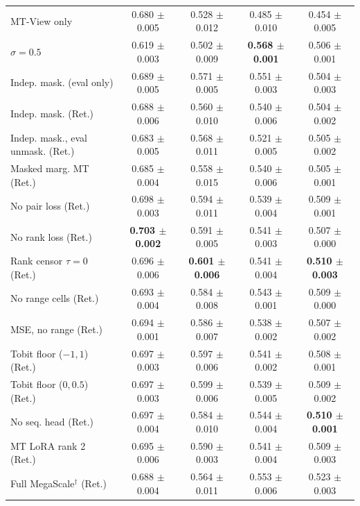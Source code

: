 \begin{table}[H]
{\begin{tabular}{lcccc}
MT-View only & 0.680 $\pm$ 0.005 & 0.528 $\pm$ 0.012 & 0.485 $\pm$ 0.010 & 0.454 $\pm$ 0.005 \\
$\sigma=0.5$ & 0.619 $\pm$ 0.003 & 0.502 $\pm$ 0.009 & \textbf{0.568 $\pm$ 0.001} & 0.506 $\pm$ 0.001 \\
Indep. mask. (eval only) & 0.689 $\pm$ 0.005 & 0.571 $\pm$ 0.005 & 0.551 $\pm$ 0.003 & 0.504 $\pm$ 0.003 \\
Indep. mask. (Ret.) & 0.688 $\pm$ 0.006 & 0.560 $\pm$ 0.010 & 0.540 $\pm$ 0.006 & 0.504 $\pm$ 0.002 \\
Indep. mask., eval unmask. (Ret.) & 0.683 $\pm$ 0.005 & 0.568 $\pm$ 0.011 & 0.521 $\pm$ 0.005 & 0.505 $\pm$ 0.002 \\
Masked marg. MT (Ret.) & 0.685 $\pm$ 0.004 & 0.558 $\pm$ 0.015 & 0.540 $\pm$ 0.006 & 0.505 $\pm$ 0.001 \\
No pair loss (Ret.) & 0.698 $\pm$ 0.003 & 0.594 $\pm$ 0.011 & 0.539 $\pm$ 0.004 & 0.509 $\pm$ 0.001 \\
No rank loss (Ret.) & \textbf{0.703 $\pm$ 0.002} & 0.591 $\pm$ 0.005 & 0.541 $\pm$ 0.003 & 0.507 $\pm$ 0.000 \\
Rank censor $\tau=0$ (Ret.) & 0.696 $\pm$ 0.006 & \textbf{0.601 $\pm$ 0.006} & 0.541 $\pm$ 0.004 & \textbf{0.510 $\pm$ 0.003} \\
No range cells (Ret.) & 0.693 $\pm$ 0.004 & 0.584 $\pm$ 0.008 & 0.543 $\pm$ 0.001 & 0.509 $\pm$ 0.000 \\
MSE, no range (Ret.) & 0.694 $\pm$ 0.001 & 0.586 $\pm$ 0.007 & 0.538 $\pm$ 0.002 & 0.507 $\pm$ 0.002 \\
Tobit floor ($-1, 1$) (Ret.) & 0.697 $\pm$ 0.003 & 0.597 $\pm$ 0.006 & 0.541 $\pm$ 0.002 & 0.508 $\pm$ 0.001 \\
Tobit floor ($0, 0.5$) (Ret.) & 0.697 $\pm$ 0.003 & 0.599 $\pm$ 0.006 & 0.539 $\pm$ 0.005 & 0.509 $\pm$ 0.002 \\
No seq. head (Ret.) & 0.697 $\pm$ 0.004 & 0.584 $\pm$ 0.010 & 0.544 $\pm$ 0.004 & \textbf{0.510 $\pm$ 0.001} \\
MT LoRA rank 2 (Ret.) & 0.695 $\pm$ 0.006 & 0.590 $\pm$ 0.003 & 0.541 $\pm$ 0.004 & 0.509 $\pm$ 0.003 \\
Full MegaScale$^\dagger$ (Ret.) & 0.688 $\pm$ 0.004 & 0.564 $\pm$ 0.011 & 0.553 $\pm$ 0.006 & 0.523 $\pm$ 0.003 \\
\bottomrule
\end{tabular}
}
\end{table}
